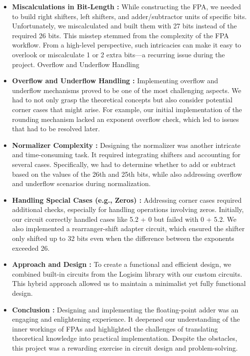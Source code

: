 \documentclass{article}
\begin{document}
\begin{itemize}
    \item \textbf{Miscalculations in Bit-Length : }
    While constructing the FPA, we needed to build right shifters, left shifters, and adder/subtractor units of specific bits. Unfortunately, we miscalculated and built them with 27 bits instead of the required 26 bits. This misstep stemmed from the complexity of the FPA workflow. From a high-level perspective, such intricacies can make it easy to overlook or miscalculate 1 or 2 extra bits—a recurring issue during the project.
    Overflow and Underflow Handling
    \item \textbf{Overflow and Underflow Handling : }
    Implementing overflow and underflow mechanisms proved to be one of the most challenging aspects. We had to not only grasp the theoretical concepts but also consider potential corner cases that might arise. For example, our initial implementation of the rounding mechanism lacked an exponent overflow check, which led to issues that had to be resolved later.
    \item \textbf{Normalizer Complexity : }
    Designing the normalizer was another intricate and time-consuming task. It required integrating shifters and accounting for several cases. Specifically, we had to determine whether to add or subtract based on the values of the 26th and 25th bits, while also addressing overflow and underflow scenarios during normalization.
    \item \textbf{Handling Special Cases (e.g., Zeros) : }
    Addressing corner cases required additional checks, especially for handling operations involving zeros. Initially, our circuit correctly handled cases like 5.2 + 0 but failed with 0 + 5.2. We also implemented a rearranger-shift adapter circuit, which ensured the shifter only shifted up to 32 bits even when the difference between the exponents exceeded 26.
    \item \textbf{Approach and Design : }
    To create a functional and efficient design, we combined built-in circuits from the Logisim library with our custom circuits. This hybrid approach allowed us to maintain a minimalist yet fully functional design.
    \item \textbf{Conclusion : }
    Designing and implementing the floating-point adder was an engaging and enlightening experience. It deepened our understanding of the inner workings of FPAs and highlighted the challenges of translating theoretical knowledge into practical implementation. Despite the obstacles, this project was a rewarding exercise in circuit design and problem-solving.
\end{itemize}
 
\end{document}
